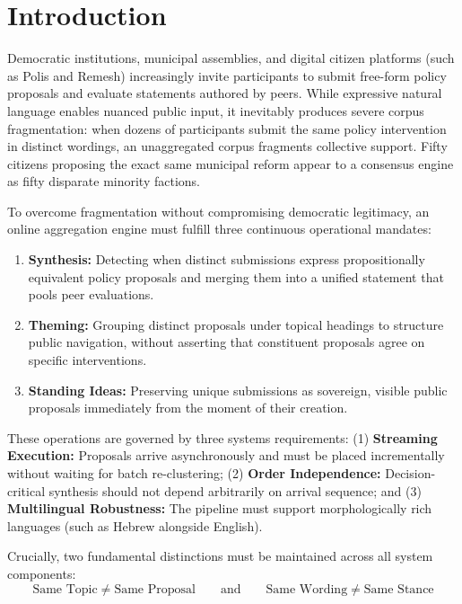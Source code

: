 \documentclass{article}
\begin{document}
\section{Introduction}

Democratic institutions, municipal assemblies, and digital citizen platforms (such as Polis and Remesh) increasingly invite participants to submit free-form policy proposals and evaluate statements authored by peers. While expressive natural language enables nuanced public input, it inevitably produces severe corpus fragmentation: when dozens of participants submit the same policy intervention in distinct wordings, an unaggregated corpus fragments collective support. Fifty citizens proposing the exact same municipal reform appear to a consensus engine as fifty disparate minority factions.

To overcome fragmentation without compromising democratic legitimacy, an online aggregation engine must fulfill three continuous operational mandates:

\begin{enumerate}
\item \textbf{Synthesis:} Detecting when distinct submissions express propositionally equivalent policy proposals and merging them into a unified statement that pools peer evaluations.
\item \textbf{Theming:} Grouping distinct proposals under topical headings to structure public navigation, without asserting that constituent proposals agree on specific interventions.
\item \textbf{Standing Ideas:} Preserving unique submissions as sovereign, visible public proposals immediately from the moment of their creation.
\end{enumerate}

These operations are governed by three systems requirements: (1) \textbf{Streaming Execution:} Proposals arrive asynchronously and must be placed incrementally without waiting for batch re-clustering; (2) \textbf{Order Independence:} Decision-critical synthesis should not depend arbitrarily on arrival sequence; and (3) \textbf{Multilingual Robustness:} The pipeline must support morphologically rich languages (such as Hebrew alongside English).

Crucially, two fundamental distinctions must be maintained across all system components:
\begin{equation}
\text{Same Topic} \neq \text{Same Proposal} \qquad \text{and} \qquad \text{Same Wording} \neq \text{Same Stance}
\end{equation}
\end{document}
